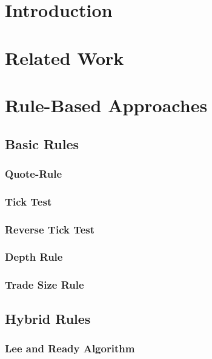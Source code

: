 \section{Introduction}\label{introduction}

\section{Related Work}\label{related-work}

\section{Rule-Based Approaches}\label{rule-based-approaches}

\subsection{Basic Rules}\label{basic-rules}

\subsubsection{Quote-Rule}\label{quote-rule}

\subsubsection{Tick Test}\label{tick-test}

\subsubsection{Reverse Tick Test}\label{reverse-tick-test}

\subsubsection{Depth Rule}\label{depth-rule}

\subsubsection{Trade Size Rule}\label{trade-size-rule}

\subsection{Hybrid Rules}\label{hybrid-rules}

\subsubsection{Lee and Ready Algorithm}\label{lee-and-ready-algorithm}

